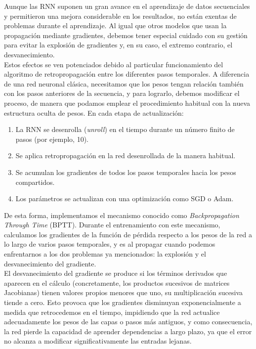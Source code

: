 Aunque las RNN suponen un gran avance en el aprendizaje de datos secuenciales y permitieron una mejora considerable en los resultados, no están exentas de problemas durante el aprendizaje. Al igual que otros modelos que usan la propagación mediante gradientes, debemos tener especial cuidado con su gestión para evitar la explosión de gradientes y, en su caso, el extremo contrario, el desvanecimiento.\\

Estos efectos se ven potenciados debido al particular funcionamiento del algoritmo de retropropagación entre los diferentes pasos temporales. A diferencia de una red neuronal clásica, necesitamos que los pesos tengan relación también con los pasos anteriores de la secuencia, y para lograrlo, debemos modificar el proceso, de manera que podamos emplear el procedimiento habitual con la nueva estructura oculta de pesos. En cada etapa de actualización:

\begin{enumerate}
    \item La RNN se desenrolla (\textit{unroll}) en el tiempo durante un número finito de pasos (por ejemplo, 10).

    \item Se aplica retropropagación en la red desenrollada de la manera habitual.

    \item Se acumulan los gradientes de todos los pasos temporales hacia los pesos compartidos.

    \item Los parámetros se actualizan con una optimización como SGD o Adam.
\end{enumerate}

De esta forma, implementamos el mecanismo conocido como \textit{Backpropagation Through Time} (BPTT). Durante el entrenamiento con este mecanismo, calculamos los gradientes de la función de pérdida respecto a los pesos de la red a lo largo de varios pasos temporales, y es al propagar cuando podemos enfrentarnos a los dos problemas ya mencionados: la explosión y el desvanecimiento del gradiente.\\

El desvanecimiento del gradiente se produce si los términos derivados que aparecen en el cálculo (concretamente, los productos sucesivos de matrices Jacobianas) tienen valores propios menores que uno, su multiplicación sucesiva tiende a cero. Esto provoca que los gradientes disminuyan exponencialmente a medida que retrocedemos en el tiempo, impidiendo que la red actualice adecuadamente los pesos de las capas o pasos más antiguos, y como consecuencia, la red pierde la capacidad de aprender dependencias a largo plazo, ya que el error no alcanza a modificar significativamente las entradas lejanas.\\

